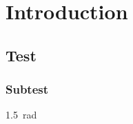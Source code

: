 \chapter{Introduction} \label{ch:introduction}

\section{Test}
\subsection{Subtest}
\SI{1.5}{\radian}